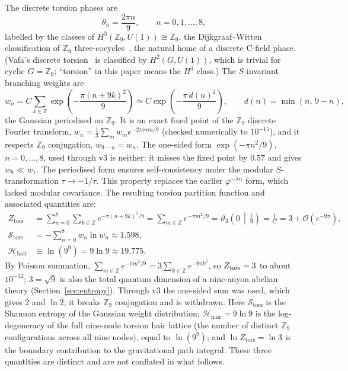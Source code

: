 \documentclass[11pt,a4paper]{article}
\begin{document}
The discrete torsion phases are
\begin{equation}
  \theta_n = \frac{2\pi n}{9}, \qquad n = 0,1,\ldots,8,
  \label{eq:torsion_phases}
\end{equation}
labelled by the classes of $H^3(\mathbb{Z}_9, U(1)) \cong \mathbb{Z}_9$, the
Dijkgraaf--Witten classification of $\mathbb{Z}_9$ three-cocycles~\cite{DijkgraafWitten1990},
the natural home of a discrete C-field phase. (Vafa's discrete
torsion~\cite{Vafa1986} is classified by $H^2(G, U(1))$, which is trivial for cyclic
$G = \mathbb{Z}_9$; ``torsion'' in this paper means the $H^3$ class.)  The $S$-invariant
branching weights are
\begin{equation}
  w_n = C\sum_{k\in\mathbb{Z}}\exp\!\left(-\frac{\pi (n+9k)^2}{9}\right)
      \simeq C\exp\!\left(-\frac{\pi\, d(n)^2}{9}\right),
  \qquad d(n) = \min(n,\,9-n),
  \label{eq:wn}
\end{equation}
the Gaussian periodised on $\mathbb{Z}_9$. It is an exact fixed point of the
$\mathbb{Z}_9$ discrete Fourier transform,
$w_n = \frac{1}{3}\sum_{m} w_m e^{-2\pi i mn/9}$ (checked numerically to $10^{-15}$),
and it respects $\mathbb{Z}_9$ conjugation, $w_{9-n} = w_n$. The one-sided form
$\exp(-\pi n^2/9)$, $n = 0,\dots,8$, used through v3 is neither: it misses the
fixed point by $0.57$ and gives $w_8 \ll w_1$. The periodised form ensures self-consistency under the modular
$S$-transformation $\tau\to-1/\tau$.  This property replaces the earlier
$\varphi^{-\lambda n}$ form, which lacked modular covariance.
The resulting torsion partition function and associated quantities are:
\begin{align}
  Z_{\mathrm{tors}} &= \sum_{n=0}^{8}\sum_{k\in\mathbb{Z}} e^{-\pi (n+9k)^2/9}
    = \sum_{m\in\mathbb{Z}} e^{-\pi m^2/9} = \vartheta_3\!\left(0\,\middle|\,\tfrac{i}{9}\right)
    = \frac{1}{C} = 3 + \mathcal{O}\!\left(e^{-9\pi}\right),
  \label{eq:Z_tors_val}\\
  \mathcal{S}_{\mathrm{tors}} &= -\sum_{n=0}^{8} w_n \ln w_n \approx 1.598,
  \label{eq:torsion_entropy}\\
  \mathcal{H}_{\mathrm{hair}} &\equiv \ln(9^9) = 9\ln 9 \approx 19.775.
  \label{eq:H_hair}
\end{align}
By Poisson summation, $\sum_{m\in\mathbb{Z}} e^{-\pi m^2/9} = 3\sum_{k\in\mathbb{Z}} e^{-9\pi k^2}$,
so $Z_{\rm tors} = 3$ to about $10^{-12}$; $3 = \sqrt{9}$ is also the total quantum
dimension of a nine-anyon abelian theory (Section~\ref{sec:entropy}). Through v3 the one-sided sum
was used, which gives 2 and $\ln 2$; it breaks $\mathbb{Z}_9$ conjugation and is withdrawn.
Here $\mathcal{S}_{\mathrm{tors}}$ is the Shannon entropy of the Gaussian weight
distribution; $\mathcal{H}_{\mathrm{hair}} = 9\ln 9$ is the log-degeneracy of
the full nine-node torsion hair lattice (the number of distinct $\mathbb{Z}_9$
configurations across all nine nodes), equal to $\ln(9^9)$; and
$\ln Z_{\mathrm{tors}} = \ln 3$ is the boundary contribution to the gravitational
path integral.  These three quantities are distinct and are not conflated in what
follows.
\end{document}
